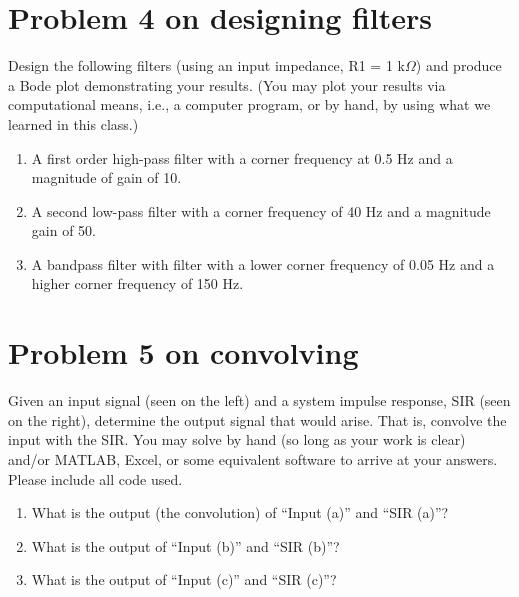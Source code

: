 \documentclass[11pt]{book}
\begin{document}
\section{Problem 4 on designing filters}
Design the following filters (using an input impedance, R1 = 1 k$\Omega$) and produce a Bode plot demonstrating your results. (You may plot your results via computational means, i.e., a computer program, or by hand, by using what we learned in this class.)
\begin{enumerate}
	\item A first order high-pass filter with a corner frequency at 0.5 Hz and a magnitude of gain of 10.
	\item A second low-pass filter with a corner frequency of 40 Hz and a magnitude gain of 50.
	\item A bandpass filter with filter with a lower corner frequency of 0.05 Hz and a higher corner frequency of 150 Hz.
\end{enumerate}


\section{Problem 5 on convolving}

Given an input signal (seen on the left) and a system impulse response, SIR (seen on the right), determine the output signal that would arise. That is, convolve the input with the SIR. You may solve by hand (so long as your work is clear) and/or MATLAB, Excel, or some equivalent software to arrive at your answers. Please include all code used.
\begin{enumerate}
	\item What is the output (the convolution) of ``Input (a)'' and ``SIR (a)''?
	\item What is the output of ``Input (b)'' and ``SIR (b)''?
	\item What is the output of ``Input (c)'' and ``SIR (c)''?
\end{enumerate}
\end{document}
